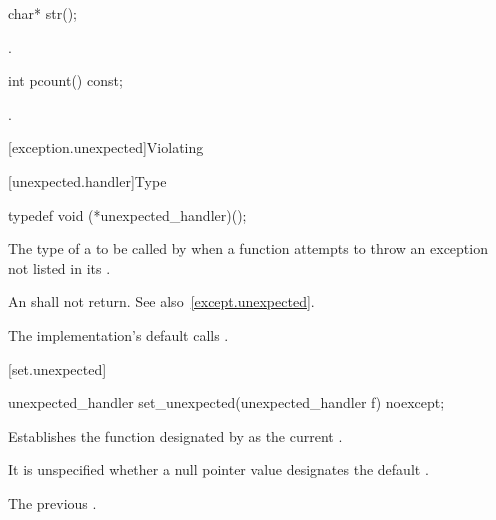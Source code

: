 %
\begin{itemdecl}
char* str();
\end{itemdecl}

\begin{itemdescr}
\pnum
\returns
{}.
\end{itemdescr}

%
\begin{itemdecl}
int pcount() const;
\end{itemdecl}

\begin{itemdescr}
\pnum
\returns
{}.
\end{itemdescr}

[exception.unexpected]{Violating }

[unexpected.handler]{Type }

%
\begin{itemdecl}
typedef void (*unexpected_handler)();
\end{itemdecl}

\begin{itemdescr}
\pnum
The type of a
to be called by
when a function attempts to throw an exception not listed in its
.

\pnum
\required
An
shall not return.
See also~\ref{except.unexpected}.

\pnum
{}
The implementation's default  calls
.
\end{itemdescr}

[set.unexpected]{}

%
\begin{itemdecl}
unexpected_handler set_unexpected(unexpected_handler f) noexcept;
\end{itemdecl}

\begin{itemdescr}
\pnum
\effects
Establishes the function designated by  as the current
.

\pnum
\remark It is unspecified whether a null pointer value designates the default
.

\pnum
\returns
The previous .
\end{itemdescr}

